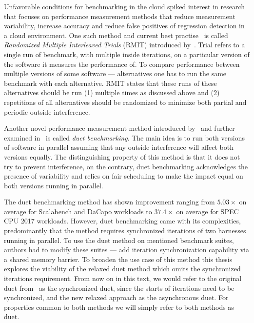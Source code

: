 Unfavorable conditions for benchmarking in the cloud spiked interest in research that focuses on performance measurement methods that reduce measurement variability, increase accuracy and reduce false positives of regression detection in a cloud environment.
One such method and current best practise~\cite{laaber2019software} is called \emph{Randomized Multiple Interleaved Trials} (RMIT) introduced by~\citet{abedi2017conducting}.
Trial refers to a single run of benchmark, with multiple inside iterations, on a particular version of the software it measures the performance of.
To compare performance between multiple versions of some software --- alternatives one has to run the same benchmark with each alternative.
RMIT states that these runs of these alternatives should be run (1) multiple times as discussed above and (2) repetitions of all alternatives should be randomized to minimize both partial and periodic outside interference.

Another novel performance measurement method introduced by~\citet{bulej2019initial} and further examined in~\citet{bulej2020duet} is called \emph{duet benchmarking}.
The main idea is to run both versions of software in parallel assuming that any outside interference will affect both versions equally.
The distinguishing property of this method is that it does not try to prevent interference, on the contrary, duet benchmarking acknowledges the presence of variability and relies on fair scheduling to make the impact equal on both versions running in parallel.

The duet benchmarking method has shown improvement ranging from $5.03 \times$ on average for Scalabench and DaCapo workloads to $37.4 \times$ on average for SPEC CPU 2017 workloads.
However, duet benchmarking came with its complexities, predominantly that the method requires synchronized iterations of two harnesses running in parallel.
To use the duet method on mentioned benchmark suites, authors had to modify these suites --- add iteration synchronization capability via a shared memory barrier.
To broaden the use case of this method this thesis explores the viability of the relaxed duet method which omits the synchronized iterations requirement.
From now on in this text, we would refer to the original duet from~\citet{bulej2020duet} as the synchronized duet, since the starts of iterations need to be synchronized, and the new relaxed approach as the asynchronous duet.
For properties common to both methods we will simply refer to both methods as duet.
